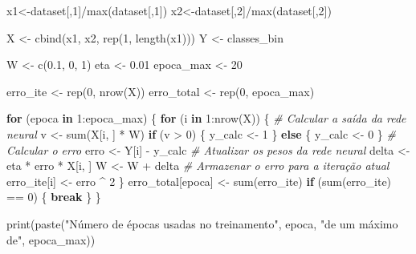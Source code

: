 \documentclass[
]{article}
\newenvironment{Shaded}{\begin{snugshade}}{\end{snugshade}}
\newcommand{\CommentTok}[1]{\textcolor[rgb]{0.56,0.35,0.01}{\textit{#1}}}
\newcommand{\ControlFlowTok}[1]{\textcolor[rgb]{0.13,0.29,0.53}{\textbf{#1}}}
\newcommand{\DecValTok}[1]{\textcolor[rgb]{0.00,0.00,0.81}{#1}}
\newcommand{\FloatTok}[1]{\textcolor[rgb]{0.00,0.00,0.81}{#1}}
\newcommand{\FunctionTok}[1]{\textcolor[rgb]{0.00,0.00,0.00}{#1}}
\newcommand{\NormalTok}[1]{#1}
\newcommand{\OtherTok}[1]{\textcolor[rgb]{0.56,0.35,0.01}{#1}}
\newcommand{\SpecialCharTok}[1]{\textcolor[rgb]{0.00,0.00,0.00}{#1}}
\newcommand{\StringTok}[1]{\textcolor[rgb]{0.31,0.60,0.02}{#1}}
\begin{document}
\begin{Shaded}
\begin{Highlighting}[]
\NormalTok{x1}\OtherTok{\textless{}{-}}\NormalTok{dataset[,}\DecValTok{1}\NormalTok{]}\SpecialCharTok{/}\FunctionTok{max}\NormalTok{(dataset[,}\DecValTok{1}\NormalTok{])}
\NormalTok{x2}\OtherTok{\textless{}{-}}\NormalTok{dataset[,}\DecValTok{2}\NormalTok{]}\SpecialCharTok{/}\FunctionTok{max}\NormalTok{(dataset[,}\DecValTok{2}\NormalTok{])}

\NormalTok{X }\OtherTok{\textless{}{-}} \FunctionTok{cbind}\NormalTok{(x1, x2, }\FunctionTok{rep}\NormalTok{(}\DecValTok{1}\NormalTok{, }\FunctionTok{length}\NormalTok{(x1)))}
\NormalTok{Y }\OtherTok{\textless{}{-}}\NormalTok{ classes\_bin}

\NormalTok{W }\OtherTok{\textless{}{-}} \FunctionTok{c}\NormalTok{(}\FloatTok{0.1}\NormalTok{, }\DecValTok{0}\NormalTok{, }\DecValTok{1}\NormalTok{)}
\NormalTok{eta }\OtherTok{\textless{}{-}} \FloatTok{0.01}
\NormalTok{epoca\_max }\OtherTok{\textless{}{-}} \DecValTok{20}

\NormalTok{erro\_ite }\OtherTok{\textless{}{-}} \FunctionTok{rep}\NormalTok{(}\DecValTok{0}\NormalTok{, }\FunctionTok{nrow}\NormalTok{(X))}
\NormalTok{erro\_total }\OtherTok{\textless{}{-}} \FunctionTok{rep}\NormalTok{(}\DecValTok{0}\NormalTok{, epoca\_max)}

\ControlFlowTok{for}\NormalTok{ (epoca }\ControlFlowTok{in} \DecValTok{1}\SpecialCharTok{:}\NormalTok{epoca\_max) \{}
  \ControlFlowTok{for}\NormalTok{ (i }\ControlFlowTok{in} \DecValTok{1}\SpecialCharTok{:}\FunctionTok{nrow}\NormalTok{(X)) \{}
    \CommentTok{\# Calcular a saída da rede neural}
\NormalTok{    v }\OtherTok{\textless{}{-}} \FunctionTok{sum}\NormalTok{(X[i, ] }\SpecialCharTok{*}\NormalTok{ W)}
    \ControlFlowTok{if}\NormalTok{ (v }\SpecialCharTok{\textgreater{}} \DecValTok{0}\NormalTok{) \{}
\NormalTok{      y\_calc }\OtherTok{\textless{}{-}} \DecValTok{1}
\NormalTok{    \} }\ControlFlowTok{else}\NormalTok{ \{}
\NormalTok{      y\_calc }\OtherTok{\textless{}{-}} \DecValTok{0}
\NormalTok{    \}}
    \CommentTok{\# Calcular o erro}
\NormalTok{    erro }\OtherTok{\textless{}{-}}\NormalTok{ Y[i] }\SpecialCharTok{{-}}\NormalTok{ y\_calc}
    \CommentTok{\# Atualizar os pesos da rede neural}
\NormalTok{    delta }\OtherTok{\textless{}{-}}\NormalTok{ eta }\SpecialCharTok{*}\NormalTok{ erro }\SpecialCharTok{*}\NormalTok{ X[i, ]}
\NormalTok{    W }\OtherTok{\textless{}{-}}\NormalTok{ W }\SpecialCharTok{+}\NormalTok{ delta}
    \CommentTok{\# Armazenar o erro para a iteração atual}
\NormalTok{    erro\_ite[i] }\OtherTok{\textless{}{-}}\NormalTok{ erro }\SpecialCharTok{\^{}} \DecValTok{2}
\NormalTok{  \}}
\NormalTok{  erro\_total[epoca] }\OtherTok{\textless{}{-}} \FunctionTok{sum}\NormalTok{(erro\_ite)}
  \ControlFlowTok{if}\NormalTok{ (}\FunctionTok{sum}\NormalTok{(erro\_ite) }\SpecialCharTok{==} \DecValTok{0}\NormalTok{) \{}
    \ControlFlowTok{break}
\NormalTok{  \}}
\NormalTok{\}}

\FunctionTok{print}\NormalTok{(}\FunctionTok{paste}\NormalTok{(}\StringTok{"Número de épocas usadas no treinamento"}\NormalTok{, epoca, }\StringTok{"de um máximo de"}\NormalTok{, epoca\_max))}
\end{Highlighting}
\end{Shaded}
\end{document}
